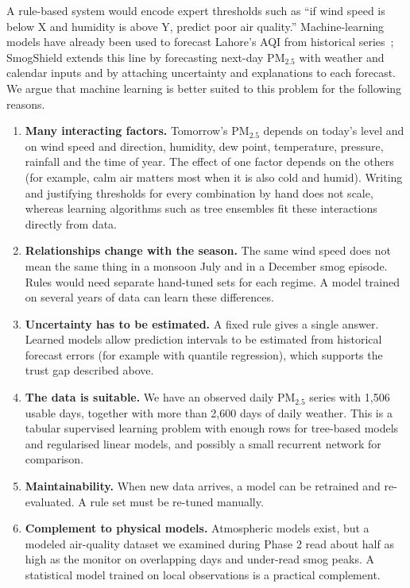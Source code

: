 A rule-based system would encode expert thresholds such as ``if wind speed is below X and humidity is above Y, predict poor air quality.'' Machine-learning models have already been used to forecast Lahore's AQI from historical series~\cite{waqas2024lahore}; SmogShield extends this line by forecasting next-day PM$_{2.5}$ with weather and calendar inputs and by attaching uncertainty and explanations to each forecast. We argue that machine learning is better suited to this problem for the following reasons.

\begin{enumerate}
  \item \textbf{Many interacting factors.} Tomorrow's PM$_{2.5}$ depends on today's level and on wind speed and direction, humidity, dew point, temperature, pressure, rainfall and the time of year. The effect of one factor depends on the others (for example, calm air matters most when it is also cold and humid). Writing and justifying thresholds for every combination by hand does not scale, whereas learning algorithms such as tree ensembles fit these interactions directly from data.
  \item \textbf{Relationships change with the season.} The same wind speed does not mean the same thing in a monsoon July and in a December smog episode. Rules would need separate hand-tuned sets for each regime. A model trained on several years of data can learn these differences.
  \item \textbf{Uncertainty has to be estimated.} A fixed rule gives a single answer. Learned models allow prediction intervals to be estimated from historical forecast errors (for example with quantile regression), which supports the trust gap described above.
  \item \textbf{The data is suitable.} We have an observed daily PM$_{2.5}$ series with 1{,}506 usable days, together with more than 2{,}600 days of daily weather. This is a tabular supervised learning problem with enough rows for tree-based models and regularised linear models, and possibly a small recurrent network for comparison.
  \item \textbf{Maintainability.} When new data arrives, a model can be retrained and re-evaluated. A rule set must be re-tuned manually.
  \item \textbf{Complement to physical models.} Atmospheric models exist, but a modeled air-quality dataset we examined during Phase 2 read about half as high as the monitor on overlapping days and under-read smog peaks. A statistical model trained on local observations is a practical complement.
\end{enumerate}

